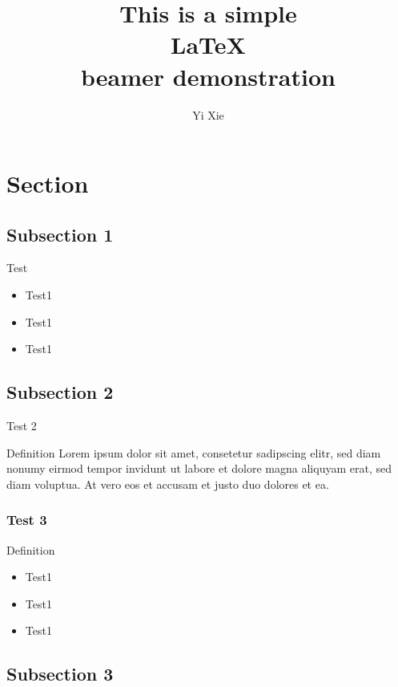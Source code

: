 \documentclass{beamer}
\title{This is a simple \\
\LaTeX{} \\
beamer demonstration}
\author{Yi Xie}
\begin{document}
\GTtitle

\section{Section}

    \subsection{Subsection 1}

        \begin{frame}{Test}
            \begin{itemize}
                \item Test1
                \pause
                \item Test1
                \pause
                \item Test1
            \end{itemize}
        \end{frame}

    \subsection{Subsection 2}

        \begin{frame}{Test 2}
            \begin{block}{Definition}
                Lorem ipsum dolor sit amet, consetetur sadipscing elitr, sed diam nonumy eirmod tempor invidunt ut labore et dolore magna aliquyam erat, sed diam voluptua. At vero eos et accusam et justo duo dolores et ea.
            \end{block}
        \end{frame}

        \begin{frame}
            \frametitle{Test 3}
            \begin{block}{Definition}
            \begin{itemize}
                \item Test1
                \item Test1
                \item Test1
            \end{itemize}
            \end{block}
        \end{frame}

   \subsection{Subsection 3}
   
\end{document}
